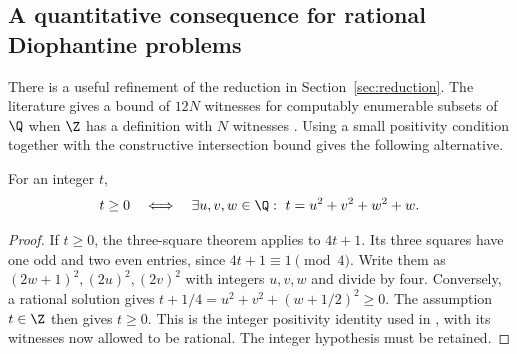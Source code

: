 \subsection{A quantitative consequence for rational Diophantine problems}
\label{subsec:quantitative-mrdp}

There is a useful refinement of the reduction in
Section~\ref{sec:reduction}. The literature gives a bound of $12N$
witnesses for computably enumerable subsets of $\Q$ when $\Z$ has
a definition with $N$ witnesses \cite[Remark 8.23]{DDF2025}.
Using a small positivity condition together with the constructive
intersection bound gives the following alternative.

\begin{lemma}\label{lem:integer-positivity-rational}
For an integer $t$,
\[
 t\ge0\quad\Longleftrightarrow\quad
 \exists u,v,w\in\Q:\ t=u^2+v^2+w^2+w.
\]
\end{lemma}
\begin{proof}
If $t\ge0$, the three-square theorem applies to $4t+1$.
Its three squares have one odd and two even entries, since
$4t+1\equiv1\pmod4$. Write them as $(2w+1)^2,(2u)^2,(2v)^2$
with integers $u,v,w$ and divide by four. Conversely, a rational
solution gives
$t+1/4=u^2+v^2+(w+1/2)^2\ge0$. The assumption $t\in\Z$
then gives $t\ge0$. This is the integer positivity identity used
in \cite[Equation (1.1)]{Sun2021}, with its witnesses now allowed
to be rational. The integer hypothesis must be retained.
\end{proof}

